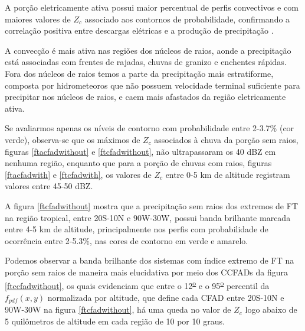 A porção eletricamente ativa possui maior percentual de perfis convectivos e com maiores valores de $Z_c$ associado aos contornos de probabilidade, confirmando a correlação positiva entre descargas elétricas e a produção de precipitação \cite{Petersen1998}.

A convecção é mais ativa nas regiões dos núcleos de raios, aonde a precipitação está associadas com frentes de rajadas, chuvas de granizo e enchentes rápidas. Fora dos núcleos de raios temos a parte da precipitação mais estratiforme, composta por hidrometeoros que não possuem velocidade terminal suficiente para precipitar nos núcleos de raios, e caem mais afastados da região eletricamente ativa.     %



Se avaliarmos apenas os níveis de contorno com probabilidade entre 2-3.7\% (cor verde), observa-se que os máximos de $Z_c$ associados à chuva da porção sem raios, figuras \ref{ftacfadwithout} e \ref{ftcfadwithout}, não ultrapassaram os 40 dBZ em nenhuma região, enquanto que para a porção de chuvas com raios, figuras \ref{ftacfadwith} e \ref{ftcfadwith}, os valores de $Z_c$ entre 0-5 km de altitude registram valores entre 45-50 dBZ.

A figura \ref{ftcfadwithout} mostra que a precipitação sem raios dos extremos de FT na região tropical, entre 20S-10N e 90W-30W, possui banda brilhante marcada entre 4-5 km de altitude, principalmente nos perfis com probabilidade de ocorrência entre 2-5.3\%, nas cores de contorno em verde e amarelo. 

Podemos observar a banda brilhante dos sistemas com índice extremo de FT na porção sem raios de maneira mais elucidativa por meio dos CCFADs da figura \ref{ftccfadwithout}, os quais evidenciam que entre o 12\textsuperscript{\underline{o}} e o 95\textsuperscript{\underline{o}} percentil da $f_{pdf}(x,y)$ normalizada por altitude, que define cada CFAD entre 20S-10N e 90W-30W na figura \ref{ftcfadwithout}, há uma queda no valor de $Z_c$ logo abaixo de 5 quilômetros de altitude em cada região de 10 por 10 graus. 


